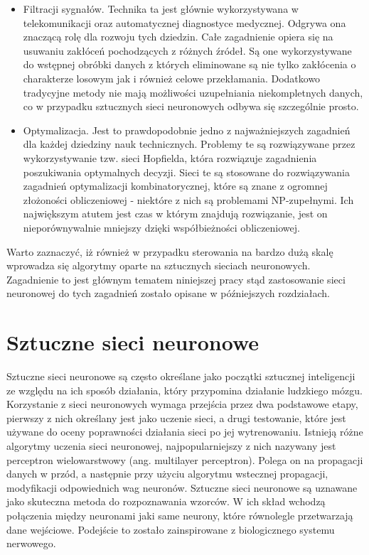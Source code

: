 \begin{itemize}
	\item Filtracji sygnałów. Technika ta jest głównie wykorzystywana w telekomunikacji oraz automatycznej diagnostyce medycznej. Odgrywa ona znaczącą rolę dla rozwoju tych dziedzin. Całe zagadnienie opiera się na usuwaniu zakłóceń pochodzących z różnych źródeł. Są one wykorzystywane do wstępnej obróbki danych z których eliminowane są nie tylko zakłócenia o charakterze losowym jak i również celowe przekłamania. Dodatkowo tradycyjne metody nie mają możliwości uzupełniania niekompletnych danych, co w przypadku sztucznych sieci neuronowych odbywa się szczególnie prosto.
	\item Optymalizacja. Jest to prawdopodobnie jedno z najważniejszych zagadnień dla każdej dziedziny nauk technicznych. Problemy te są rozwiązywane przez wykorzystywanie tzw. sieci Hopfielda, która rozwiązuje zagadnienia poszukiwania optymalnych decyzji. Sieci te są stosowane do rozwiązywania zagadnień optymalizacji kombinatorycznej, które są znane z ogromnej złożoności obliczeniowej - niektóre z nich są problemami NP-zupełnymi. Ich największym atutem jest czas w którym znajdują rozwiązanie, jest on nieporównywalnie mniejszy dzięki współbieżności obliczeniowej. 
\end{itemize}

Warto zaznaczyć, iż również w przypadku sterowania na bardzo dużą skalę wprowadza się algorytmy oparte na sztucznych sieciach neuronowych. Zagadnienie to jest głównym tematem niniejszej pracy stąd zastosowanie sieci neuronowej do tych zagadnień zostało opisane w późniejszych rozdziałach.

\section{Sztuczne sieci neuronowe}
Sztuczne sieci neuronowe są często określane jako początki sztucznej inteligencji ze względu na ich sposób działania, który przypomina działanie ludzkiego mózgu. Korzystanie z sieci neuronowych wymaga przejścia przez dwa podstawowe etapy, pierwszy z nich określany jest jako uczenie sieci, a drugi testowanie, które jest używane do oceny poprawności działania sieci po jej wytrenowaniu. Istnieją różne algorytmy uczenia sieci neuronowej, najpopularniejszy z nich nazywany jest perceptron wielowarstwowy (ang. multilayer perceptron). Polega on na propagacji danych w przód, a następnie przy użyciu algorytmu wstecznej propagacji, modyfikacji odpowiednich wag neuronów. Sztuczne sieci neuronowe są uznawane jako skuteczna metoda do rozpoznawania wzorców. W ich skład wchodzą połączenia między neuronami jaki same neurony, które równolegle przetwarzają dane wejściowe. Podejście to zostało zainspirowane z biologicznego systemu nerwowego.

